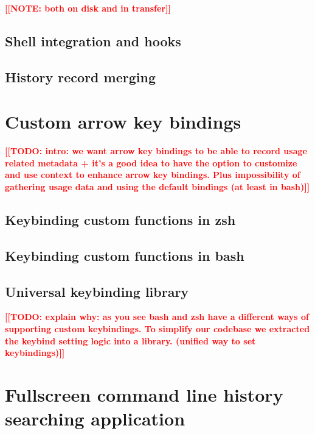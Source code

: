 \documentclass[thesis=M,english]{FITthesis}[2012/10/20]
\newcommand{\todotext}[1]{\textcolor{red}{\textbf{[[#1]]}}}
\newcommand{\blind}[1][1]{\textcolor{mygray}{\Blindtext[#1][1]}}
\begin{document}
\todotext{NOTE: both on disk and in transfer}

\blind

\subsection{Shell integration and hooks}

\blind

\subsection{History record merging}

\blind

\section{Custom arrow key bindings}

\todotext{TODO: intro: we want arrow key bindings to be able to record usage related metadata + it's a good idea to have the option to customize and use context to enhance arrow key bindings. Plus impossibility of gathering usage data and using the default bindings (at least in bash)}

\blind

\subsection{Keybinding custom functions in zsh}

\blind

\subsection{Keybinding custom functions in bash}

\blind


\subsection{Universal keybinding library}
\todotext{TODO: explain why: as you see bash and zsh have a different ways of supporting custom keybindings. To simplify our codebase we extracted the keybind setting logic into a library. (unified way to set keybindings)}

\blind


\section{Fullscreen command line history searching application}
\end{document}
